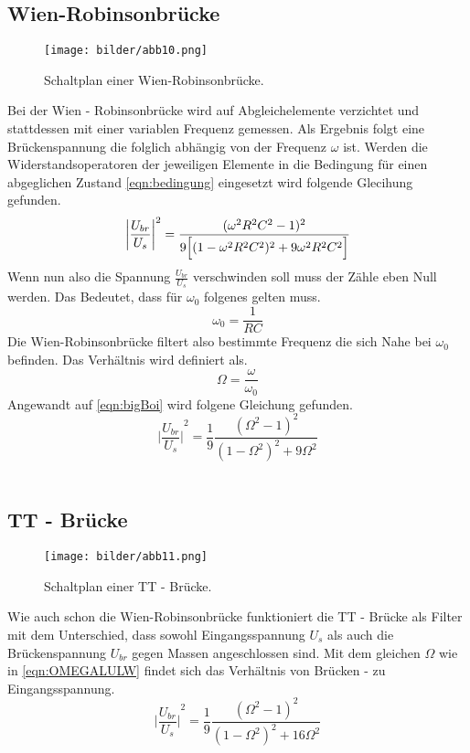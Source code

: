 \subsection{Wien-Robinsonbrücke}
\begin{figure}
    \centering
    \texttt{[image: bilder/abb10.png]}
    \caption{Schaltplan einer Wien-Robinsonbrücke. \cite{skript}} 
    \label{fig:abb10}
\end{figure}
Bei der Wien - Robinsonbrücke wird auf Abgleichelemente verzichtet und stattdessen mit einer variablen Frequenz gemessen.
Als Ergebnis folgt eine Brückenspannung die folglich abhängig von der Frequenz $\omega$ ist.
Werden die Widerstandsoperatoren der jeweiligen Elemente 
in die Bedingung für einen abgeglichen Zustand \eqref{eqn:bedingung} eingesetzt wird folgende Glecihung gefunden.
\begin{equation} %
    \label{eqn:bigBoi}
    {\biggl| \frac{U_{br}}{U_s} \biggr| }^2 = \frac{(\omega ^2 R^2 C^2 -1)^2}{9\Bigl[(1-\omega ^2 R^2 C^2)^2 + 9 \omega ^2 R^2 C^2 \Bigr]}
\end{equation}
Wenn nun also die Spannung $\frac{U_{br}}{U_s}$ verschwinden soll muss der Zähle eben Null werden. Das Bedeutet, dass für 
$\omega_0$ folgenes gelten muss.
\begin{equation*}
    \omega_0 = \frac{1}{RC}
\end{equation*}
Die Wien-Robinsonbrücke filtert also bestimmte Frequenz die sich Nahe bei $\omega_0$ befinden. Das Verhältnis wird definiert als.
\begin{equation}
    \label{eqn:OMEGALULW}
    \Omega = \frac{\omega}{\omega_0}
\end{equation}
Angewandt auf \eqref{eqn:bigBoi} wird folgene Gleichung gefunden.
\begin{equation}
    {\biggl| \frac{U_{br}}{U_s} \biggr| }^2 = \frac{1}{9}\frac{(\Omega^2 -1)^2}{(1-\Omega^2)^2+9\Omega^2}
\end{equation}
\\
\newline
\subsection{TT - Brücke}
\begin{figure}
    \centering
    \texttt{[image: bilder/abb11.png]}
    \caption{Schaltplan einer TT - Brücke. \cite{skript}} 
    \label{fig:abb11}
\end{figure}
Wie auch schon die Wien-Robinsonbrücke funktioniert die TT - Brücke als Filter mit dem Unterschied, dass sowohl Eingangsspannung
$U_s$ als auch die Brückenspannung $U_{br}$ gegen Massen angeschlossen sind.
Mit dem gleichen $\Omega$ wie in \eqref{eqn:OMEGALULW} findet sich das Verhältnis von Brücken - zu Eingangsspannung.
\begin{equation}
    {\biggl| \frac{U_{br}}{U_s} \biggr| }^2 = \frac{1}{9}\frac{(\Omega^2 -1)^2}{(1-\Omega^2)^2+16\Omega^2} 
\end{equation}
\\
\newline
